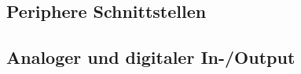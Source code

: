 \subsection{Periphere Schnittstellen}\label{3.4}
\subsection{Analoger und digitaler In-/Output}\label{3.5}